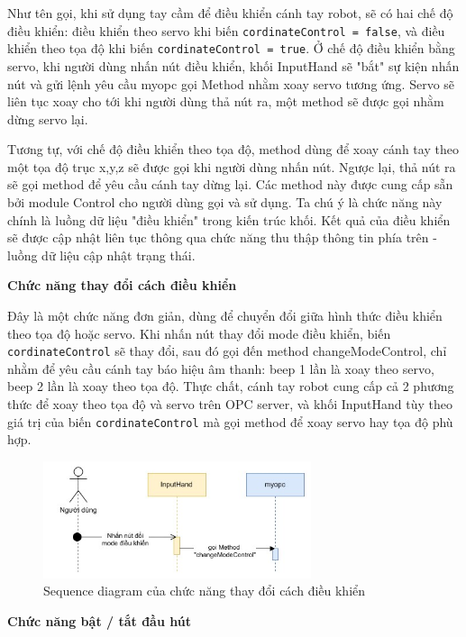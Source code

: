 Như tên gọi, khi sử dụng tay cầm để điều khiển cánh tay robot, sẽ có hai chế độ điều khiển: điều khiển theo servo khi biến \lstinline{cordinateControl = false}, và điều khiển theo tọa độ khi biến \lstinline{cordinateControl = true}. Ở chế độ điều khiển bằng servo, khi người dùng nhấn nút điều khiển, khối InputHand sẽ "bắt" sự kiện nhấn nút và gửi lệnh yêu cầu myopc gọi Method nhằm xoay servo tương ứng. Servo sẽ liên tục xoay cho tới khi người dùng thả nút ra, một method sẽ được gọi nhằm dừng servo lại.

Tương tự, với chế độ điều khiển theo tọa độ, method dùng để xoay cánh tay theo một tọa độ trục x,y,z sẽ được gọi khi người dùng nhấn nút. Ngược lại, thả nút ra sẽ gọi method để yêu cầu cánh tay dừng lại. Các method này được cung cấp sẵn bởi module Control cho người dùng gọi và sử dụng. Ta chú ý là chức năng này chính là luồng dữ liệu "điều khiển" trong kiến trúc khối. Kết quả của điều khiển sẽ được cập nhật liên tục thông qua chức năng thu thập thông tin phía trên - luồng dữ liệu cập nhật trạng thái.

\textbf{Chức năng thay đổi cách điều khiển} 

Đây là một chức năng đơn giản, dùng để chuyển đổi giữa hình thức điều khiển theo tọa độ hoặc servo. Khi nhấn nút thay đổi mode điều khiển, biến \lstinline{cordinateControl} sẽ thay đổi, sau đó gọi đến method changeModeControl, chỉ nhằm để yêu cầu cánh tay báo hiệu âm thanh: beep 1 lần là xoay theo servo, beep 2 lần là xoay theo tọa độ. Thực chất, cánh tay robot cung cấp cả 2 phương thức để xoay theo tọa độ và servo trên OPC server, và khối InputHand tùy theo giá trị của biến \lstinline{cordinateControl} mà gọi method để xoay servo hay tọa độ phù hợp.

\begin{figure}[H]
    \centering
    \includegraphics[width=0.7\textwidth]{Images/Implementation/VRapp/VR_changemode.jpg}
    \caption{Sequence diagram của chức năng thay đổi cách điều khiển}
    \label{fig:seq_controller_change}
\end{figure}

\textbf{Chức năng bật / tắt đầu hút} 

